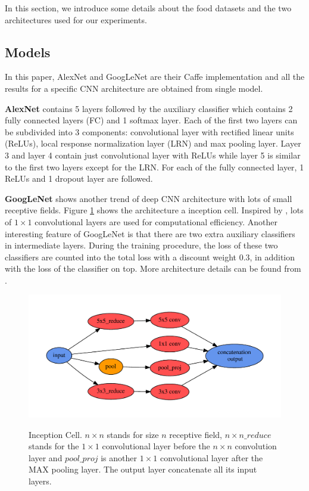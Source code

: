 ﻿In this section, we introduce some details about the food datasets and the two architectures used for our experiments.
\subsection{Models}
In this paper, AlexNet and GoogLeNet are their Caffe \cite{jia2014caffe} implementation and all the results for a specific CNN architecture are obtained from single model.

\textbf{AlexNet}
 contains 5 layers followed by the auxiliary classifier which contains 2 fully connected layers (FC) and 1 softmax layer. Each of the first two layers can be subdivided into 3 components: convolutional layer with rectified linear units (ReLUs), local response normalization layer (LRN) and max pooling layer. Layer 3 and layer 4 contain just convolutional layer with ReLUs while layer 5 is similar to the first two layers except for the LRN. For each of the fully connected layer, 1 ReLUs and 1 dropout \cite{srivastava2014dropout} layer are followed.

 \textbf{GoogLeNet}
  shows another trend of deep CNN architecture with lots of small receptive fields. Figure \ref{incept} shows the architecture a inception cell. Inspired by \cite{linNiN}, lots of $1\times 1$ convolutional layers are used for computational efficiency. Another interesting feature of GoogLeNet is that there are two extra auxiliary classifiers in intermediate layers. During the training procedure, the loss of these two classifiers are counted into the total loss with a discount weight 0.3, in addition with the loss of the classifier on top. More architecture details can be found from \cite{szegedy2014going}.

\begin{figure}
  \centering
  \includegraphics[scale=.45]{fig/inception.pdf}\\
  \caption{Inception Cell. $n\times n$ stands for size $n$ receptive field, $n\times n\_reduce$ stands for the $1\times 1$ convolutional layer before the $n\times n$ convolution layer and $pool\_proj$ is another $1\times 1$ convolutional layer after the MAX pooling layer. The output layer concatenate all its input layers.}\label{incept}
\end{figure}

